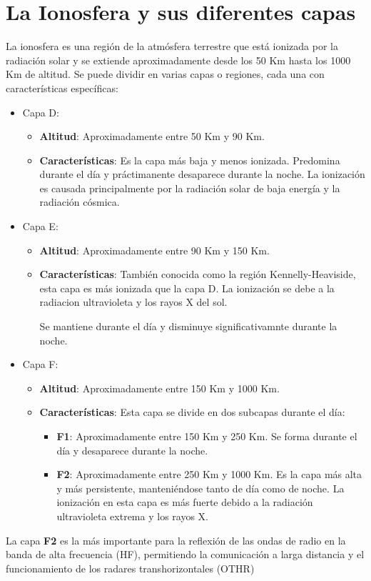 \documentclass[12pt]{article}
\begin{document}
\section{La Ionosfera y sus diferentes capas}
La ionosfera es una región de la atmósfera terrestre que está ionizada por la radiación 
solar y se extiende aproximadamente desde los 50 Km hasta los 1000 Km de altitud. Se 
puede dividir en varias capas o regiones, cada una con características específicas:\par
\begin{itemize}
    \item Capa D:
    \begin{itemize}
        \item \textbf{Altitud}: Aproximadamente entre 50 Km y 90 Km.
        \item \textbf{Características}: Es la capa más baja y menos ionizada. Pre\-do\-mi\-na
        durante el día y práctimanente desaparece durante la noche. La ionización es causada
        principalmente por la radiación solar de baja energía y la radiación cósmica.
    \end{itemize}
    \item Capa E:
    \begin{itemize}
        \item \textbf{Altitud}: Aproximadamente entre 90 Km y 150 Km.
        \item \textbf{Características}: También conocida como la región Kennelly-Heaviside, 
        esta capa es más ionizada que la capa D. La ionización se debe a la radiacion ultravioleta
        y los rayos X del sol. \par
        Se mantiene durante el día y disminuye significativamnte durante la noche.
    \end{itemize}
    \item Capa F:
    \begin{itemize}
        \item \textbf{Altitud}: Aproximadamente entre 150 Km y 1000 Km.
        \item \textbf{Características}: Esta capa se divide en dos subcapas durante el día:
            \begin{itemize}
                \item \textbf{F1}: Aproximadamente entre 150 Km y 250 Km. Se forma durante el día 
                y desaparece durante la noche.
                \item \textbf{F2}: Aproximadamente entre 250 Km y 1000 Km. Es la capa más alta y más persistente,
                manteniéndose tanto de día como de noche. La ionización en esta capa es más 
                fuerte debido a la radiación ultravioleta extrema y los rayos X.
            \end{itemize}
    \end{itemize}
\end{itemize}
La capa \textbf{F2} es la más importante para la reflexión de las ondas de radio en la banda de alta 
frecuencia (HF), permitiendo la comunicación a larga distancia y el funcionamiento de los radares
transhorizontales (OTHR)
\end{document}

